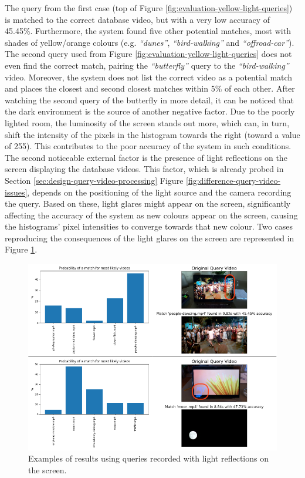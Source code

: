 The query from the first case (top of Figure \ref{fig:evaluation-yellow-light-queries}) is matched to the correct database video, but with a very low accuracy of 45.45\%. Furthermore, the system found five other potential matches, most with shades of yellow/orange colours (e.g. \textit{``dunes''}, \textit{``bird-walking''} and \textit{``offroad-car''}). The second query used from Figure \ref{fig:evaluation-yellow-light-queries} does not even find the correct match, pairing the \textit{``butterfly''} query to the \textit{``bird-walking''} video. Moreover, the system does not list the correct video as a potential match and places the closest and second closest matches within 5\% of each other. After watching the second query of the butterfly in more detail, it can be noticed that the dark environment is the source of another negative factor. Due to the poorly lighted room, the luminosity of the screen stands out more, which can, in turn, shift the intensity of the pixels in the histogram towards the right (toward a value of 255). This contributes to the poor accuracy of the system in such conditions.\\

The second noticeable external factor is the presence of light reflections on the screen displaying the database videos. This factor, which is already probed in Section \ref{sec:design-query-video-processing} Figure \ref{fig:difference-query-video-issues}, depends on the positioning of the light source and the camera recording the query. Based on these, light glares might appear on the screen, significantly affecting the accuracy of the system as new colours appear on the screen, causing the histograms' pixel intensities to converge towards that new colour. Two cases reproducing the consequences of the light glares on the screen are represented in Figure \ref{fig:evaluation-light-reflection-queries}.\\ %

\begin{figure}[h] 
\centerline{\includegraphics[width=\textwidth]{figures/evaluation/light-reflection-queries.png}}
\caption{\label{fig:evaluation-light-reflection-queries}Examples of results using queries recorded with light reflections on the screen.}
\end{figure}

